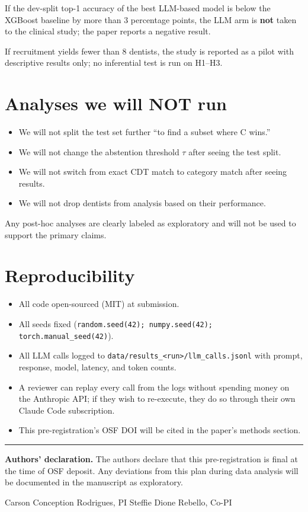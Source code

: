 \documentclass[11pt,letterpaper]{article}
\begin{document}
If the dev-split top-1 accuracy of the best LLM-based model is below the
XGBoost baseline by more than 3 percentage points, the LLM arm is
\textbf{not} taken to the clinical study; the paper reports a negative
result.

If recruitment yields fewer than 8 dentists, the study is reported as a
pilot with descriptive results only; no inferential test is run on H1--H3.

\section{Analyses we will NOT run}

\begin{itemize}
    \item We will not split the test set further ``to find a subset where C wins.''
    \item We will not change the abstention threshold $\tau$ after seeing the test split.
    \item We will not switch from exact CDT match to category match after seeing results.
    \item We will not drop dentists from analysis based on their performance.
\end{itemize}

Any post-hoc analyses are clearly labeled as exploratory and will not be used
to support the primary claims.

\section{Reproducibility}

\begin{itemize}
    \item All code open-sourced (MIT) at submission.
    \item All seeds fixed (\texttt{random.seed(42); numpy.seed(42); torch.manual\_seed(42)}).
    \item All LLM calls logged to \texttt{data/results\_<run>/llm\_calls.jsonl} with prompt, response, model, latency, and token counts.
    \item A reviewer can replay every call from the logs without spending money on the Anthropic API; if they wish to re-execute, they do so through their own Claude Code subscription.
    \item This pre-registration's OSF DOI will be cited in the paper's methods section.
\end{itemize}

\bigskip

\hrule
\bigskip

\noindent\textbf{Authors' declaration.} The authors declare that this
pre-registration is final at the time of OSF deposit. Any deviations from
this plan during data analysis will be documented in the manuscript as
exploratory.

\bigskip

\noindent
Carson Conception Rodrigues, PI \hfill Steffie Dione Rebello, Co-PI
\end{document}
